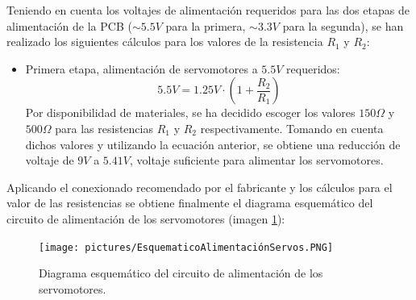 Teniendo en cuenta los voltajes de alimentación requeridos para las dos etapas de alimentación de la \ac{PCB} ($\sim 5.5V$ para la primera, $\sim 3.3V$ para la segunda), se han realizado los siguientes cálculos para los valores de la resistencia $R_1$ y $R_2$:
\begin{itemize}
    \item Primera etapa, alimentación de servomotores a $5.5V$ requeridos:
    \begin{equation}
        5.5V = 1.25V \cdot \left( 1 + \frac{R_2}{R_1}\right) 
    \end{equation}
    Por disponibilidad de materiales, se ha decidido escoger los valores $150\Omega$ y $500\Omega$ para las resistencias $R_1$ y $R_2$ respectivamente. Tomando en cuenta dichos valores y utilizando la ecuación anterior, se obtiene una reducción de voltaje de $9V$ a $5.41V$, voltaje suficiente para alimentar los servomotores.
\end{itemize}

Aplicando el conexionado recomendado por el fabricante y los cálculos para el valor de las resistencias se obtiene finalmente el diagrama esquemático del circuito de alimentación de los servomotores (imagen \ref{fig:Esquematico_Alimentacion_Servos}):

\begin{figure}[H]
    \centering 
    \texttt{[image: pictures/EsquematicoAlimentaciónServos.PNG]}
    \caption{Diagrama esquemático del circuito de alimentación de los servomotores.}
    \label{fig:Esquematico_Alimentacion_Servos}
\end{figure}

